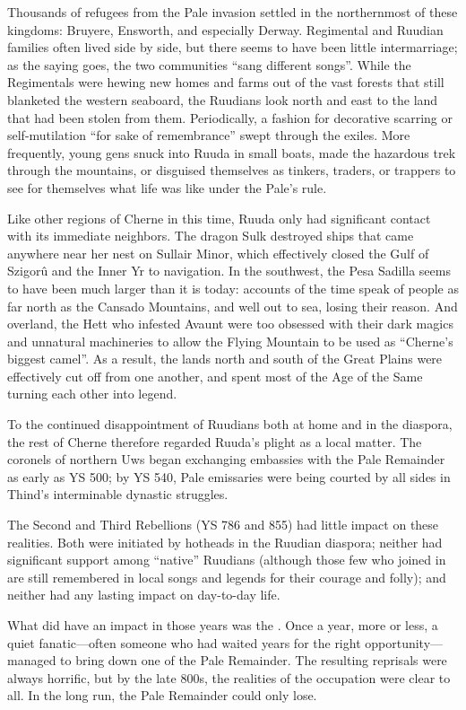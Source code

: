 \documentclass[12pt]{report}
\begin{document}
Thousands of refugees from the Pale invasion settled in the
northernmost of these kingdoms: Bruyere, Ensworth, and especially
Derway.  Regimental and Ruudian families often lived side by side, but
there seems to have been little intermarriage; as the saying goes, the
two communities ``sang different songs''.  While the Regimentals were
hewing new homes and farms out of the vast forests that still
blanketed the western seaboard, the Ruudians look north and east to
the land that had been stolen from them.  Periodically, a fashion for
decorative scarring or self-mutilation ``for sake of remembrance'' swept
through the exiles.  More frequently, young gens snuck into Ruuda in
small boats, made the hazardous trek through the mountains, or
disguised themselves as tinkers, traders, or trappers to see for
themselves what life was like under the Pale's rule.

Like other regions of Cherne in this time, Ruuda only had significant
contact with its immediate neighbors.  The dragon Sulk destroyed ships
that came anywhere near her nest on Sullair Minor, which effectively
closed the Gulf of Szigor\^u and the Inner Yr to navigation.  In the
southwest, the Pesa Sadilla seems to have been much larger than it is
today: accounts of the time speak of people as far north as the
Cansado Mountains, and well out to sea, losing their reason.  And
overland, the Hett who infested Avaunt were too obsessed with their
dark magics and unnatural machineries to allow the Flying Mountain to
be used as ``Cherne's biggest camel''.  As a result, the lands north and
south of the Great Plains were effectively cut off from one another,
and spent most of the Age of the Same turning each other into legend.

To the continued disappointment of Ruudians both at home and in the
diaspora, the rest of Cherne therefore regarded Ruuda's plight as a
local matter.  The coronels of northern Uws began exchanging embassies
with the Pale Remainder as early as YS 500; by YS 540, Pale emissaries
were being courted by all sides in Thind's interminable dynastic
struggles.

The Second and Third Rebellions (YS 786 and 855) had little impact on
these realities.  Both were initiated by hotheads in the Ruudian
diaspora; neither had significant support among ``native'' Ruudians
(although those few who joined in are still remembered in local songs
and legends for their courage and folly); and neither had any lasting
impact on day-to-day life.

What did have an impact in those years was the {\aemott}.  Once a
year, more or less, a quiet fanatic---often someone who had waited
years for the right opportunity---managed to bring down one of the
Pale Remainder.  The resulting reprisals were always horrific, but by
the late 800s, the realities of the occupation were clear to all.  In
the long run, the Pale Remainder could only lose.
\end{document}
